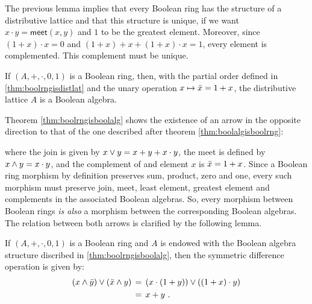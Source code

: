 The previous lemma implies that every Boolean ring has the structure of a
distributive lattice and that this structure is unique, if we want
$x\cdot y=\mathsf{meet}(x,y)$ and $1$ to be the greatest element. Moreover,
since $(1+x)\cdot x=0$ and $(1+x) + x + (1+x)\cdot x =1$, every element
is complemented. This complement must be unique.

\begin{thmBoolRngIsBoolAlg}\label{thm:boolrngisboolalg}
	If $(A,+,\cdot,0,1)$ is a Boolean ring, then, with the partial
	order defined in \ref{thm:boolrngisdistlat} and the unary operation
	$x\mapsto \bar{x}=1+x$, the distributive lattice $A$ is a Boolean
	algebra.
\end{thmBoolRngIsBoolAlg}

Theorem \ref{thm:boolrngisboolalg} shows the existence of an arrow in
the opposite direction to that of the one described after theorem
\ref{thm:boolalgisboolrng}:
\begin{center}
\end{center}
where the join is given by $x\vee y= x+y+x\cdot y$, the meet is defined
by $x\wedge y= x\cdot y$, and the complement of and element $x$ is
$\bar{x}=1+x$. Since a Boolean ring morphism by definition preserves sum,
product, zero and one, every such morphism must preserve join, meet, least
element, greatest element and complements in the associated Boolean algebras.
So, every morphism between Boolean rings \emph{is also} a morphism between
the corresponding Boolean algebras. The relation between both arrows is
clarified by the following lemma.

\begin{lemmaSymmDiff}\label{thm:symmdiff}
	If $(A,+,\cdot,0,1)$ is a Boolean ring and $A$ is endowed with
	the Boolean algebra structure discribed in \ref{thm:boolrngisboolalg},
	then the symmetric difference operation is given by:
	\begin{align*}
		(x\wedge\bar{y})\vee(\bar{x}\wedge y) & \,=\,
			(x\cdot(1+y))\vee ((1+x)\cdot y) \\
		& \,=\, x+y
		\text{ .}
	\end{align*}
\end{lemmaSymmDiff}

